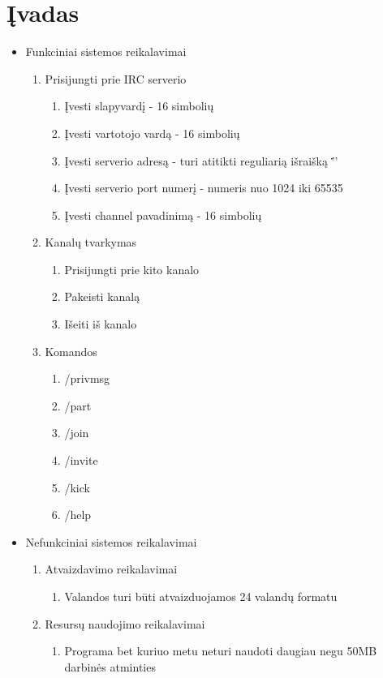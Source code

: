 \section{Įvadas}

\begin{itemize}
  \item Funkciniai sistemos reikalavimai
    \begin{enumerate}
      \item Prisijungti prie IRC serverio
        \begin{enumerate}
          \item Įvesti slapyvardį - 16 simbolių
          \item Įvesti vartotojo vardą - 16 simbolių
          \item Įvesti serverio adresą - turi atitikti reguliarią išraišką '\w*\.\w*\.\w*'
          \item Įvesti serverio port numerį - numeris nuo 1024 iki 65535
          \item Įvesti channel pavadinimą - 16 simbolių
        \end{enumerate}
      \item Kanalų tvarkymas
        \begin{enumerate}
          \item Prisijungti prie kito kanalo
          \item Pakeisti kanalą
          \item Išeiti iš kanalo
        \end{enumerate}
      \item Komandos
        \begin{enumerate}
          \item /privmsg
          \item /part
          \item /join
          \item /invite
          \item /kick
          \item /help
        \end{enumerate}
    \end{enumerate}
  \item Nefunkciniai sistemos reikalavimai
    \begin{enumerate}
      \item Atvaizdavimo reikalavimai
        \begin{enumerate}
          \item Valandos turi būti atvaizduojamos 24 valandų formatu
        \end{enumerate}
      \item Resursų naudojimo reikalavimai
        \begin{enumerate}
          \item Programa bet kuriuo metu neturi naudoti daugiau negu 50MB darbinės atminties
        \end{enumerate}
    \end{enumerate}
\end{itemize}
